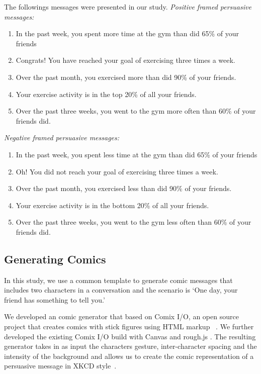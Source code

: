 The followings messages were presented in our study.
\textit{Positive framed persuasive messages:}
\begin{enumerate}
 \item In the past week, you spent more time at the gym than did 65\% of your friends
 \item Congrats! You have reached your goal of exercising three times a week.
 \item Over the past month, you exercised more than did 90\% of your friends.
 \item Your exercise activity is in the top 20\% of all your friends.
 \item Over the past three weeks, you went to the gym more often than 60\% of your friends did.
\end{enumerate}\par
\textit{Negative framed persuasive messages:}
\begin{enumerate}
 \item	In the past week, you spent less time at the gym than did 65\% of your friends
 \item  Oh! You did not reach your goal of exercising three times a week.
 \item	Over the past month, you exercised less than did 90\% of your friends.
 \item	Your exercise activity is in the bottom 20\% of all your friends.
 \item	Over the past three weeks, you went to the gym less often than 60\% of your friends did.
\end{enumerate}

\subsection{Generating Comics}
In this study, we use a common template to generate comic messages that includes two characters in a conversation and the scenario is `One day, your friend has something to tell you.'

We developed an comic generator that based on Comix I/O, an open source project that creates comics with stick figures using HTML markup ~\cite{cmx.io}. We further developed the existing Comix I/O build with Canvas and rough.js \cite{canvasjs,rough.js}. The resulting generator takes in as input the characters gesture, inter-character spacing and the intensity of the background and allows us to create the comic representation of a persuasive message in XKCD style~\cite{munroe2009xkcd}.

